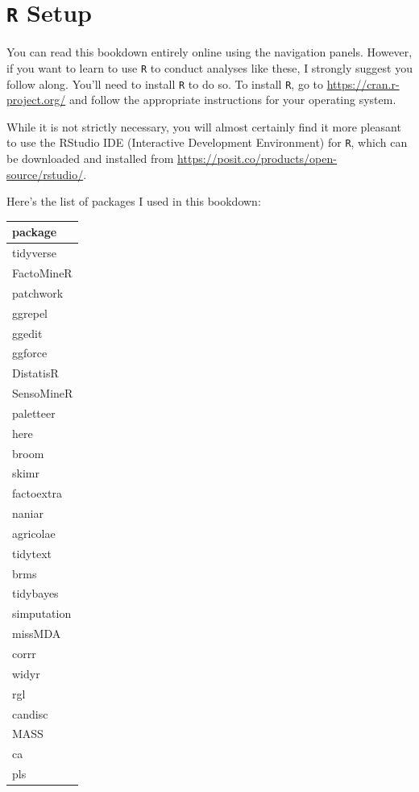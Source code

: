 \documentclass[
]{book}
\begin{document}
\section*{\texorpdfstring{\texttt{R} Setup}{R Setup}}\label{r-setup}

You can read this bookdown entirely online using the navigation panels. However, if you want to learn to use \texttt{R} to conduct analyses like these, I strongly suggest you follow along. You'll need to install \texttt{R} to do so. To install \texttt{R}, go to \url{https://cran.r-project.org/} and follow the appropriate instructions for your operating system.

While it is not strictly necessary, you will almost certainly find it more pleasant to use the RStudio IDE (Interactive Development Environment) for \texttt{R}, which can be downloaded and installed from \url{https://posit.co/products/open-source/rstudio/}.

Here's the list of packages I used in this bookdown:

\begin{tabular}{l}
\hline
package\\
\hline
tidyverse\\
\hline
FactoMineR\\
\hline
patchwork\\
\hline
ggrepel\\
\hline
ggedit\\
\hline
ggforce\\
\hline
DistatisR\\
\hline
SensoMineR\\
\hline
paletteer\\
\hline
here\\
\hline
broom\\
\hline
skimr\\
\hline
factoextra\\
\hline
naniar\\
\hline
agricolae\\
\hline
tidytext\\
\hline
brms\\
\hline
tidybayes\\
\hline
simputation\\
\hline
missMDA\\
\hline
corrr\\
\hline
widyr\\
\hline
rgl\\
\hline
candisc\\
\hline
MASS\\
\hline
ca\\
\hline
pls\\
\hline
\end{tabular}
\end{document}
